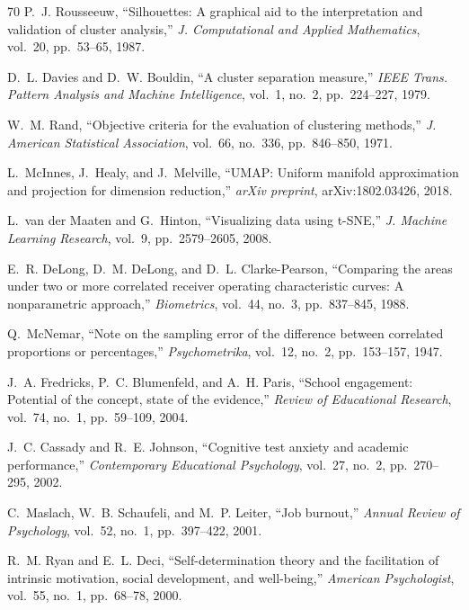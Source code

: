 \begin{thebibliography}{70}
P.~J. Rousseeuw,
``Silhouettes: A graphical aid to the interpretation and validation of cluster analysis,''
\textit{J. Computational and Applied Mathematics}, vol.~20, pp.~53--65, 1987.

D.~L. Davies and D.~W. Bouldin,
``A cluster separation measure,''
\textit{IEEE Trans. Pattern Analysis and Machine Intelligence}, vol.~1, no.~2, pp.~224--227, 1979.

W.~M. Rand,
``Objective criteria for the evaluation of clustering methods,''
\textit{J. American Statistical Association}, vol.~66, no.~336, pp.~846--850, 1971.

L.~McInnes, J.~Healy, and J.~Melville,
``UMAP: Uniform manifold approximation and projection for dimension reduction,''
\textit{arXiv preprint}, arXiv:1802.03426, 2018.

L.~van der Maaten and G.~Hinton,
``Visualizing data using t-SNE,''
\textit{J. Machine Learning Research}, vol.~9, pp.~2579--2605, 2008.

E.~R. DeLong, D.~M. DeLong, and D.~L. Clarke-Pearson,
``Comparing the areas under two or more correlated receiver operating characteristic curves: A nonparametric approach,''
\textit{Biometrics}, vol.~44, no.~3, pp.~837--845, 1988.

Q.~McNemar,
``Note on the sampling error of the difference between correlated proportions or percentages,''
\textit{Psychometrika}, vol.~12, no.~2, pp.~153--157, 1947.

J.~A. Fredricks, P.~C. Blumenfeld, and A.~H. Paris,
``School engagement: Potential of the concept, state of the evidence,''
\textit{Review of Educational Research}, vol.~74, no.~1, pp.~59--109, 2004.

J.~C. Cassady and R.~E. Johnson,
``Cognitive test anxiety and academic performance,''
\textit{Contemporary Educational Psychology}, vol.~27, no.~2, pp.~270--295, 2002.

C.~Maslach, W.~B. Schaufeli, and M.~P. Leiter,
``Job burnout,''
\textit{Annual Review of Psychology}, vol.~52, no.~1, pp.~397--422, 2001.

R.~M. Ryan and E.~L. Deci,
``Self-determination theory and the facilitation of intrinsic motivation, social development, and well-being,''
\textit{American Psychologist}, vol.~55, no.~1, pp.~68--78, 2000.


\end{thebibliography}
